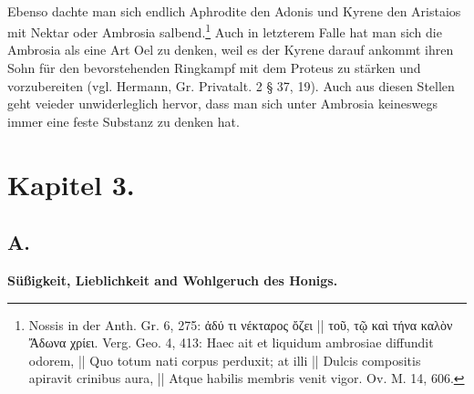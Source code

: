 \documentclass[a4paper, 11pt, oneside]{article}
\begin{document}
\paragraph{}
Ebenso dachte man sich endlich Aphrodite den Adonis und Kyrene den Aristaios mit Nektar oder Ambrosia salbend.\footnote{Nossis in der Anth. Gr. 6, 275: ἀδύ τι νέκταρος ὄζει || τοῦ, τῷ καὶ τήνα καλὸν Ἄδωνα χρίει. Verg. Geo. 4, 413: Haec ait et liquidum ambrosiae diffundit odorem, || Quo totum nati corpus perduxit; at illi || Dulcis compositis apiravit crinibus aura, || Atque habilis membris venit vigor. Ov. M. 14, 606.} Auch in letzterem Falle hat man sich die Ambrosia als eine Art Oel zu denken, weil es der Kyrene darauf ankommt ihren Sohn für den bevorstehenden Ringkampf mit dem Proteus zu stärken und vorzubereiten (vgl. Hermann, Gr. Privatalt. 2
§ 37, 19). Auch aus diesen Stellen geht veieder unwiderleglich hervor, dass man sich unter Ambrosia keineswegs immer eine feste Substanz zu denken hat.
\clearpage
\section{Kapitel 3.}
\subsection{A.}
\begin{center}
\textbf{Süßigkeit, Lieblichkeit and Wohlgeruch des Honigs.}
\end{center}
\end{document}
